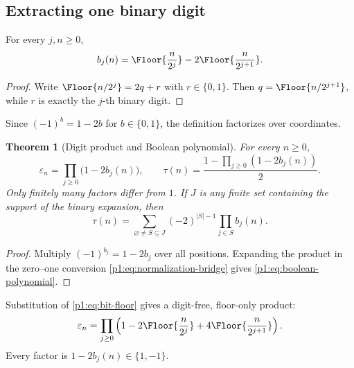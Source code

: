 \documentclass[11pt,oneside]{article}
\numberwithin{equation}{section}
\newtheorem{theorem}{Theorem}[section]
\theoremstyle{definition}
\theoremstyle{remark}
\newcommand{\eps}{\varepsilon}
\begin{document}
\subsection{Extracting one binary digit}

\begin{lemma}
\label{p1:lem:bit-floor}
For every \(j,n\ge0\),
\begin{equation}
  b_j(n)=\Floor{\frac{n}{2^j}}
          -2\Floor{\frac{n}{2^{j+1}}}.
  \label{p1:eq:bit-floor}
\end{equation}
\end{lemma}

\begin{proof}
Write \(\Floor{n/2^j}=2q+r\) with \(r\in\{0,1\}\).  Then
\(q=\Floor{n/2^{j+1}}\), while \(r\) is exactly the \(j\)-th binary
digit.
\end{proof}

Since \((-1)^b=1-2b\) for \(b\in\{0,1\}\), the definition factorizes over
coordinates.

\begin{theorem}[Digit product and Boolean polynomial]
\label{p1:thm:digit-product}
For every \(n\ge0\),
\begin{equation}
  \boxed{
  \eps_n=\prod_{j\ge0}\bigl(1-2b_j(n)\bigr),
  \qquad
  \tau(n)=\frac{1-\prod_{j\ge0}(1-2b_j(n))}{2}.}
  \label{p1:eq:digit-product}
\end{equation}
Only finitely many factors differ from \(1\).  If \(J\) is any finite set
containing the support of the binary expansion, then
\begin{equation}
  \boxed{
  \tau(n)=\sum_{\varnothing\ne S\subseteq J}
     (-2)^{|S|-1}\prod_{j\in S}b_j(n).}
  \label{p1:eq:boolean-polynomial}
\end{equation}
\end{theorem}

\begin{proof}
Multiply \((-1)^{b_j}=1-2b_j\) over all positions.  Expanding the product in
the zero--one conversion \eqref{p1:eq:normalization-bridge} gives
\eqref{p1:eq:boolean-polynomial}.
\end{proof}

Substitution of \eqref{p1:eq:bit-floor} gives a digit-free, floor-only product:
\begin{equation}
  \eps_n=
  \prod_{j\ge0}
  \left(
    1-2\Floor{\frac{n}{2^j}}
      +4\Floor{\frac{n}{2^{j+1}}}
  \right).
  \label{p1:eq:pure-floor-product}
\end{equation}
Every factor is \(1-2b_j(n)\in\{1,-1\}\).
\end{document}
